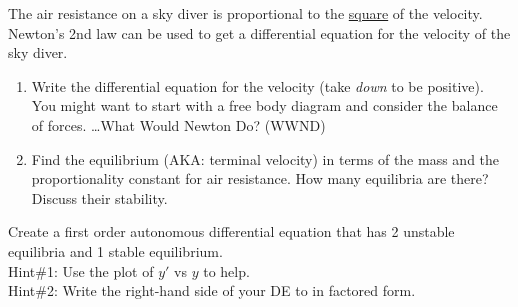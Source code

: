 \begin{problem}
    The air resistance on a sky diver is proportional to the \underline{square} of the velocity.
    Newton's 2nd law can be used to get a differential equation for the velocity of the
    sky diver.
    \begin{enumerate}
        \item Write the differential equation for the velocity (take {\it down} to be
        positive).  You might want to start with a free body diagram and consider the
        balance of forces.  \ldots What Would Newton Do? (WWND)
        \item Find the equilibrium (AKA: terminal velocity) in terms of the mass and the
            proportionality constant for air resistance. How many equilibria are there?
            Discuss their stability.
    \end{enumerate}
\end{problem}


\begin{problem}
    Create a first order autonomous differential equation that has 2 unstable equilibria
    and 1 stable equilibrium.\\
    Hint\#1: Use the plot of $y'$ vs $y$ to help.\\
    Hint\#2: Write the right-hand side of your DE to in factored form.
\end{problem}


